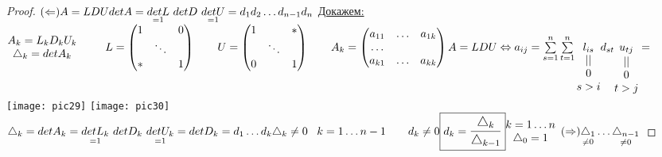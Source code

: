 \documentclass[../main.tex]{subfiles}
\begin{document}
	\begin{proof}
		$(\Leftarrow)\n 
		A = LDU \n 
		det A =\underset{=1}{det L} \ det D \ \underset{=1}{det U} = d_1 d_2 \ldots d_{n-1} d_n$\n 
		\underline{Докажем: } $\begin{matrix}
			A_k = L_k D_k U_k \\
			\triangle_k = det A_k
		\end{matrix} \Space \; \; L = \begin{pmatrix}
			1 & & 0 \\
			& \ddots\\
			* & & 1
		\end{pmatrix} \Space U = \begin{pmatrix}
			1 & & *\\
			& \ddots \\
			0 & & 1
		\end{pmatrix} \Space A_k = \begin{pmatrix}
			a_{11} & \ldots & a_{1k} \\
			\ldots\\
			a_{k1} & \ldots & a_{kk}
		\end{pmatrix} \n 
		A = LDU \Leftrightarrow a_{ij} = \sum\limits_{s=1}^n \sum\limits_{t=1}^n \underset{\begin{matrix}
				||\\
				0\\
				s>i
			\end{matrix}}{l_{is}} d_{st} \underset{\begin{matrix}
				||\\0\\t>j
			\end{matrix}}{u_{tj}} = $\n 
	\texttt{[image: pic29]} \texttt{[image: pic30]}\n 
	$\triangle_k = det A_k = \underset{=1}{det L_k} \ det D_k \ \underset{=1}{det U_k} = det D_k = d_1 \ldots d_k \n 
	\triangle_k \neq 0 \; \; \; k = 1 \ldots n-1 \Space d_k \neq 0 \n 
	\boxed{d_k = \mathlarger{\frac{\triangle_k}{\triangle_{k-1}}}} \begin{matrix}
		k = 1 \ldots n \\
		\triangle_0 = 1
	\end{matrix} \n 
	(\Rightarrow) \underset{\neq 0 }{\triangle_1} \ldots \underset{\neq 0}{\triangle_{n-1}}$\n

\end{proof}
\end{document}
